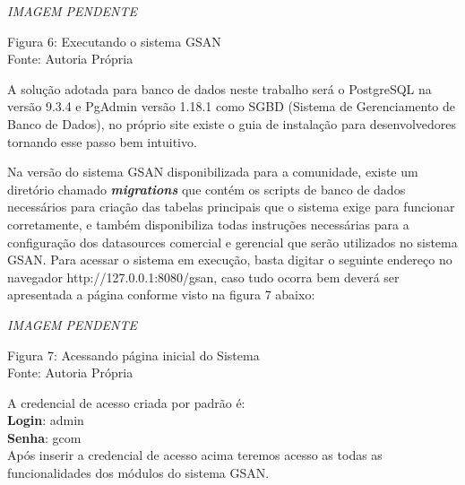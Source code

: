 \textit{IMAGEM PENDENTE} \\
\begin{center}
	Figura 6: Executando o sistema GSAN  \\
	Fonte: Autoria Própria \\
\end{center}

A solução adotada para banco de dados neste trabalho será o PostgreSQL na versão 9.3.4 e PgAdmin versão 1.18.1 como SGBD (Sistema de Gerenciamento de Banco de Dados), no próprio site existe o guia de instalação para desenvolvedores tornando esse passo bem intuitivo.

Na versão do sistema GSAN disponibilizada para a comunidade, existe um diretório chamado \textbf{\textit{migrations}} que contém os scripts de banco de dados necessários para criação das tabelas principais que o sistema exige para funcionar corretamente, e também disponibiliza todas instruções necessárias para a configuração dos datasources comercial e gerencial que serão utilizados no sistema GSAN.
Para acessar o sistema em execução, basta digitar o seguinte endereço no navegador http://127.0.0.1:8080/gsan, caso tudo ocorra bem deverá ser apresentada a página conforme visto na figura 7 abaixo:

\textit{IMAGEM PENDENTE} \\
\begin{center}
	Figura 7: Acessando página inicial do Sistema   \\
	Fonte: Autoria Própria
\end{center}

A credencial de acesso criada por padrão é: \\
\textbf{Login}: admin \\
\textbf{Senha}: gcom \\
Após inserir a credencial de acesso acima teremos acesso as todas as funcionalidades dos módulos do sistema GSAN.

